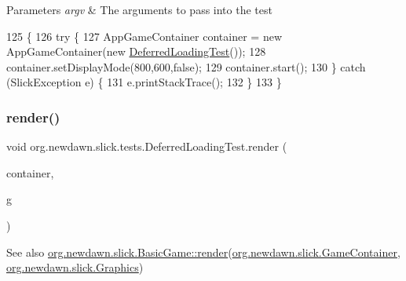 \begin{DoxyParams}{Parameters}
{\em argv} & The arguments to pass into the test \\
\hline
\end{DoxyParams}

\begin{DoxyCode}
125                                            \{
126         \textcolor{keywordflow}{try} \{
127             AppGameContainer container = \textcolor{keyword}{new} AppGameContainer(\textcolor{keyword}{new} 
      \mbox{\hyperlink{classorg_1_1newdawn_1_1slick_1_1tests_1_1_deferred_loading_test_a64e84e3546e18ba2accd4fc7d4a7e095}{DeferredLoadingTest}}());
128             container.setDisplayMode(800,600,\textcolor{keyword}{false});
129             container.start();
130         \} \textcolor{keywordflow}{catch} (SlickException e) \{
131             e.printStackTrace();
132         \}
133     \}
\end{DoxyCode}
\mbox{\label{classorg_1_1newdawn_1_1slick_1_1tests_1_1_deferred_loading_test_a63cb8647f8d34261a12603edb3434d7f}} 
\subsubsection{\texorpdfstring{render()}{render()}}
{\footnotesize\ttfamily void org.\+newdawn.\+slick.\+tests.\+Deferred\+Loading\+Test.\+render (\begin{DoxyParamCaption}\item[{\mbox{\hyperlink{classorg_1_1newdawn_1_1slick_1_1_game_container}{Game\+Container}}}]{container,  }\item[{\mbox{\hyperlink{classorg_1_1newdawn_1_1slick_1_1_graphics}{Graphics}}}]{g }\end{DoxyParamCaption})\hspace{0.3cm}{\ttfamily [inline]}}

\begin{DoxySeeAlso}{See also}
\mbox{\hyperlink{interfaceorg_1_1newdawn_1_1slick_1_1_game_af1a4670d43eb3ba04dfcf55ab1975b64}{org.\+newdawn.\+slick.\+Basic\+Game\+::render}}(\mbox{\hyperlink{classorg_1_1newdawn_1_1slick_1_1_game_container}{org.\+newdawn.\+slick.\+Game\+Container}}, \mbox{\hyperlink{classorg_1_1newdawn_1_1slick_1_1_graphics}{org.\+newdawn.\+slick.\+Graphics}}) 
\end{DoxySeeAlso}


